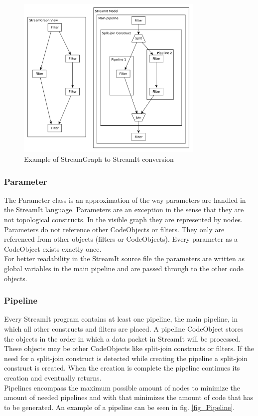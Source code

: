 \documentclass[journal]{IEEEtran}
\begin{document}
\begin{figure}[h]
	\centering
	\includegraphics[width=0.8\textwidth]{StreamGraphToStreamIt}
	\caption{Example of StreamGraph to StreamIt conversion}
	\label{fig_StreamGraph_To_StreamIt}
\end{figure}


\subsubsection{Parameter}
\noindent The Parameter class is an approximation of the way parameters are
handled in the StreamIt language. Parameters are an exception in the sense that
they are not topological constructs. In the visible graph they are represented
by nodes. Parameters do not reference other CodeObjects or filters. They only
are referenced from other objects (filters or CodeObjects). Every parameter as a
CodeObject exists exactly once.\\
For better readability in the StreamIt source file the parameters are written as
global variables in the main pipeline and are passed through to the other code
objects.\\

\subsubsection{Pipeline}
\noindent Every StreamIt program contains at least one pipeline, the main
pipeline, in which all other constructs and filters are placed. A pipeline 
CodeObject stores the objects in the order in which a data packet in StreamIt 
will be processed. These objects may be other CodeObjects like split-join 
constructs or filters. If the need for a split-join construct is detected 
while creating the pipeline a split-join construct is created. When the 
creation is complete the pipeline continues its creation and eventually 
returns.\\
Pipelines encompass the maximum possible amount of nodes to minimize the 
amount of needed pipelines and with that minimizes the amount of code 
that has to be generated. An example of a pipeline can be seen in fig. 
\ref{fig_Pipeline}.\\
\end{document}
